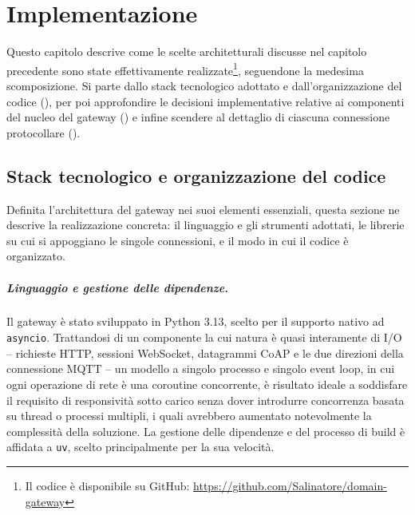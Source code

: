 \chapter{Implementazione}
\label{chap:implementazione}
%
Questo capitolo descrive come le scelte architetturali discusse nel capitolo precedente sono state effettivamente realizzate\footnote{Il codice è disponibile su GitHub: \url{https://github.com/Salinatore/domain-gateway}}, seguendone la medesima scomposizione. Si parte dallo stack tecnologico adottato e dall'organizzazione del codice (), per poi approfondire le decisioni implementative relative ai componenti del nucleo del gateway () e infine scendere al dettaglio di ciascuna connessione protocollare ().
%
\section{Stack tecnologico e organizzazione del codice}
\label{sec:stack-tecnologico-organizzazione-codice}
%
Definita l'architettura del gateway nei suoi elementi essenziali, questa sezione ne descrive la realizzazione concreta: il linguaggio e gli strumenti adottati, le librerie su cui si appoggiano le singole connessioni, e il modo in cui il codice è organizzato.

\paragraph{Linguaggio e gestione delle dipendenze.}
Il gateway è stato sviluppato in Python 3.13, scelto per il supporto nativo ad \texttt{asyncio}. Trattandosi di un componente la cui natura è quasi interamente di I/O -- richieste \ac{HTTP}, sessioni WebSocket, datagrammi \ac{CoAP} e le due direzioni della connessione \ac{MQTT} -- un modello a singolo processo e singolo event loop, in cui ogni operazione di rete è una coroutine concorrente, è risultato ideale a soddisfare il requisito di responsività sotto carico senza dover introdurre concorrenza basata su thread o processi multipli, i quali avrebbero aumentato notevolmente la complessità della soluzione. La gestione delle dipendenze e del processo di build è affidata a \texttt{uv}, scelto principalmente per la sua velocità.

